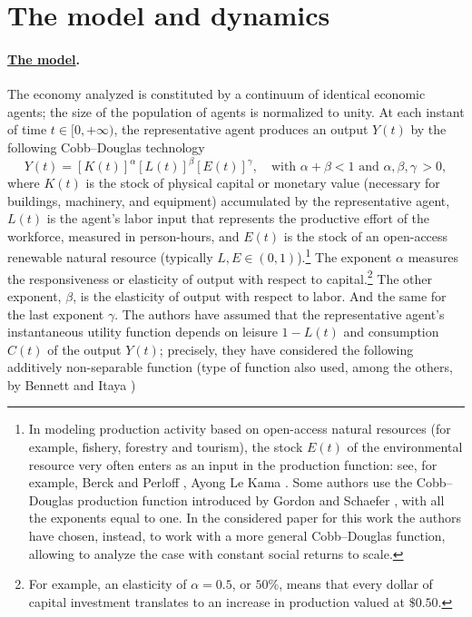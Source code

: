 \section{The model and dynamics}\label{Sec:model_dyn}
\paragraph{\underline{The model}.}
The economy analyzed is constituted by a continuum of identical economic agents; the size of the population of agents is normalized to unity. At each instant of time $t \in [0,+\infty)$, the representative agent produces an output $Y(t)$ by the following Cobb–Douglas technology
$$Y(t) = [K(t)]^\alpha[L(t)]^\beta[E(t)]^\gamma,\quad \text{with}\,\, \alpha+\beta<1\,\,  \text{and}\,\, \alpha, \beta, \gamma \,>0,$$
where $K(t)$ is the stock of physical capital or monetary value (necessary for buildings, machinery, and equipment) accumulated by the representative agent, $L(t)$ is the agent’s labor input that represents the productive effort of the workforce, measured in person-hours, and $E(t)$ is the stock of an open-access renewable natural resource (typically $L,E\in(0,1)$).\footnote{In modeling production activity based on open-access natural resources (for example, fishery, forestry and tourism), the stock $E(t)$ of the environmental resource very often enters as an input in the production function: see, for example, Berck and Perloff \cite{berck_open-access_1984}, Ayong Le Kama \cite{ayong_le_kama_sustainable_2001}. Some authors use the Cobb–Douglas production function introduced by Gordon \cite{gordon_economic_1954} and Schaefer \cite{schaefer_considerations_2019}, with all the exponents equal to one. In the considered paper for this work the authors have chosen, instead, to work with a more general Cobb–Douglas function, allowing to analyze the case with constant social returns to scale.}
The exponent $\alpha$ measures the responsiveness or elasticity of output with respect to capital.\footnote{For example, an elasticity of $\alpha=0.5$, or $50\%$, means that every dollar of capital investment translates to an increase in production valued at $\$0.50$.} The other exponent, $\beta$, is the elasticity of output with respect to labor. And the same for the last exponent $\gamma$. The authors have assumed that the representative agent’s instantaneous utility function depends on leisure $1-L(t)$ and consumption $C(t)$ of the output $Y(t)$; precisely, they have considered the following additively non-separable function (type of function also used, among the others, by Bennett \cite{bennett_indeterminacy_2000} and Itaya \cite{itaya_can_2008})
